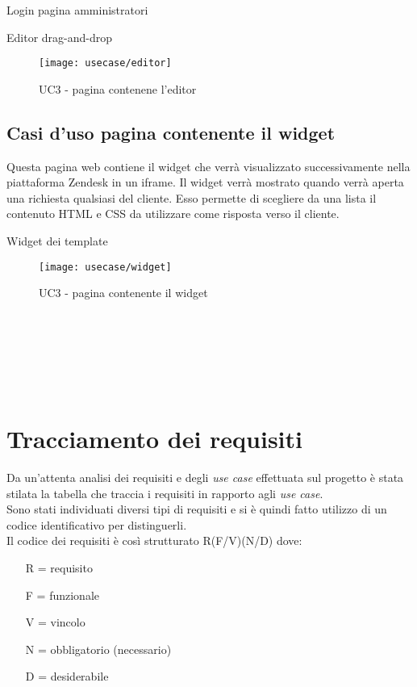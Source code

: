 \begin{usecase}{1}{Login pagina amministratori}
\begin{usecase}{3}{Editor drag-and-drop}
	\begin{figure}[!h] 
		\centering 
		\texttt{[image: usecase/editor]} 
		\caption{UC3 - pagina contenene l'editor}
	\end{figure}
\end{usecase}
\newpage
\subsection{ Casi d'uso pagina contenente il widget}
Questa pagina web contiene il widget che verrà visualizzato successivamente nella piattaforma Zendesk in un iframe. Il widget verrà mostrato quando verrà aperta una richiesta qualsiasi del cliente. Esso permette di scegliere da una lista il contenuto HTML e CSS da utilizzare come risposta verso il cliente. 
\begin{usecase}{4}{Widget dei template}
	
	\begin{figure}[!h] 
		\centering 
		\texttt{[image: usecase/widget]} 
		\caption{UC3 - pagina contenente il widget}
	\end{figure}
\\
\\
\\
\\
\\
\end{usecase}

\section{Tracciamento dei requisiti}

Da un'attenta analisi dei requisiti e degli \emph{use case} effettuata sul progetto è stata stilata la tabella che traccia i requisiti in rapporto agli \emph{use case}.\\
Sono stati individuati diversi tipi di requisiti e si è quindi fatto utilizzo di un codice identificativo per distinguerli.\\
Il codice dei requisiti è così strutturato R(F/V)(N/D) dove:
\begin{enumerate}
	\item[R =] requisito
    \item[F =] funzionale
    \item[V =] vincolo
    \item[N =] obbligatorio (necessario)
    \item[D =] desiderabile
\end{enumerate}


\end{usecase}
